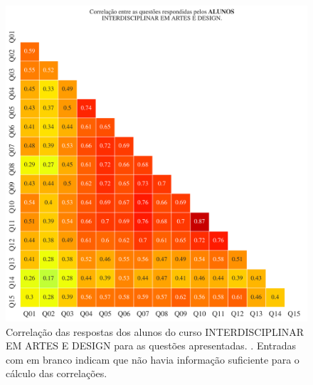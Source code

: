 \documentclass[a4paper,10pt]{article}
\begin{document}
\begin{figure}[h]
\centering
\includegraphics[width=0.999\linewidth]{matriz_corr__alunos_116500.png}
\caption{\label{fig:corr_alunos}Correlação das respostas dos alunos do curso INTERDISCIPLINAR EM ARTES E DESIGN para as questões apresentadas. . Entradas com em branco indicam que não havia informação suficiente para o cálculo das correlações.}
\end{figure}
\end{document}

